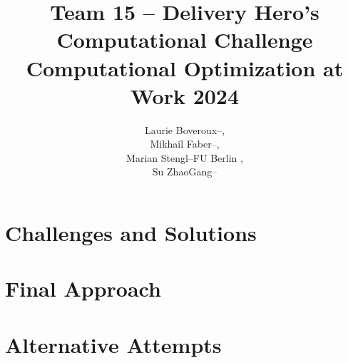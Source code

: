 \documentclass[a4paper]{article}
\title{Team 15 -- Delivery Hero's Computational Challenge \\[0.75em] \Large Computational Optimization at Work 2024}
\author{\begin{tabular}{lll}
        Laurie Boveroux & -- &  ,\tabularnewline%
        Mikhail Faber   & -- &  ,\tabularnewline%
        Marian Stengl   & -- & FU Berlin ,\tabularnewline
        Su ZhaoGang     & -- &  \tabularnewline%
\end{tabular}}
\newcommand\path{.}
\begin{document}
%
\maketitle%
\section*{Challenges and Solutions}%
%
\section*{Final Approach}%
%
\section*{Alternative Attempts}%
%
\end{document}
